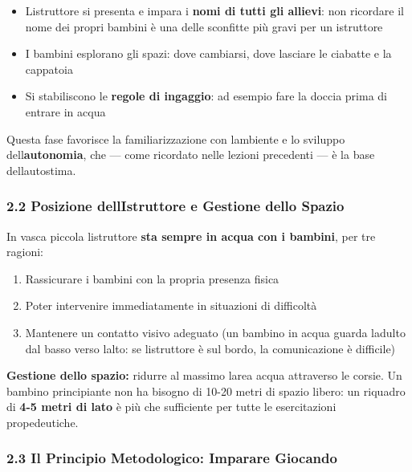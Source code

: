 \documentclass[a4paper,11pt]{article}
\providecommand{\tightlist}{%
  \setlength{\itemsep}{0pt}\setlength{\parskip}{0pt}}
\begin{document}
\begin{itemize}
      \tightlist
      \item
            L\textquotesingle istruttore si presenta e impara i \textbf{nomi di
                  tutti gli allievi}: non ricordare il nome dei propri bambini è una
            delle sconfitte più gravi per un istruttore
      \item
            I bambini esplorano gli spazi: dove cambiarsi, dove lasciare le
            ciabatte e la cappatoia
      \item
            Si stabiliscono le \textbf{regole di ingaggio}: ad esempio fare la
            doccia prima di entrare in acqua
\end{itemize}

Questa fase favorisce la familiarizzazione con
l\textquotesingle ambiente e lo sviluppo
dell\textquotesingle{}\textbf{autonomia}, che --- come ricordato nelle
lezioni precedenti --- è la base dell\textquotesingle autostima.

\subsubsection{2.2 Posizione dell\textquotesingle Istruttore e Gestione
      dello Spazio}\label{posizione-dellistruttore-e-gestione-dello-spazio}

In vasca piccola l\textquotesingle istruttore \textbf{sta sempre in
      acqua con i bambini}, per tre ragioni:

\begin{enumerate}
      \tightlist
      \item
            Rassicurare i bambini con la propria presenza fisica
      \item
            Poter intervenire immediatamente in situazioni di difficoltà
      \item
            Mantenere un contatto visivo adeguato (un bambino in acqua guarda
            l\textquotesingle adulto dal basso verso l\textquotesingle alto: se
            l\textquotesingle istruttore è sul bordo, la comunicazione è
            difficile)
\end{enumerate}

\textbf{Gestione dello spazio:} ridurre al massimo
l\textquotesingle area acqua attraverso le corsie. Un bambino
principiante non ha bisogno di 10-20 metri di spazio libero: un riquadro
di \textbf{4-5 metri di lato} è più che sufficiente per tutte le
esercitazioni propedeutiche.

\subsubsection{2.3 Il Principio Metodologico: Imparare
      Giocando}\label{il-principio-metodologico-imparare-giocando}
\end{document}
